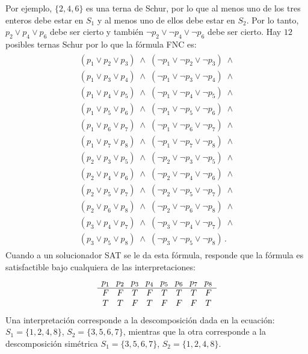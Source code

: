 Por ejemplo, $\{2,4,6\}$ es una terna de Schur, por lo que al menos uno de los tres enteros debe estar en $S_1$ y al menos uno de ellos debe estar en $S_2$. Por lo tanto, $p_2 \vee p_4 \vee p_6$ debe ser cierto y también $\neg p_2 \vee \neg p_4 \vee \neg p_6$ debe ser cierto. Hay $12$ posibles ternas Schur por lo que la fórmula FNC es:
\begin{align}
\begin{array}{l}
(p_1 \vee p_2 \vee p_3) \;\wedge\; (\neg p_1 \vee \neg p_2 \vee \neg p_3) \;\wedge \\
(p_1 \vee p_3 \vee p_4) \;\wedge\; (\neg p_1 \vee \neg p_3 \vee \neg p_4) \;\wedge \\
(p_1 \vee p_4 \vee p_5) \;\wedge\; (\neg p_1 \vee \neg p_4 \vee \neg p_5) \;\wedge \\
(p_1 \vee p_5 \vee p_6) \;\wedge\; (\neg p_1 \vee \neg p_5 \vee \neg p_6) \;\wedge \\
(p_1 \vee p_6 \vee p_7) \;\wedge\; (\neg p_1 \vee \neg p_6 \vee \neg p_7) \;\wedge \\
(p_1 \vee p_7 \vee p_8) \;\wedge\; (\neg p_1 \vee \neg p_7 \vee \neg p_8) \;\wedge \\
(p_2 \vee p_3 \vee p_5) \;\wedge\; (\neg p_2 \vee \neg p_3 \vee \neg p_5) \;\wedge \\
(p_2 \vee p_4 \vee p_6) \;\wedge\; (\neg p_2 \vee \neg p_4 \vee \neg p_6) \;\wedge \\
(p_2 \vee p_5 \vee p_7) \;\wedge\; (\neg p_2 \vee \neg p_5 \vee \neg p_7) \;\wedge \\
(p_2 \vee p_6 \vee p_8) \;\wedge\; (\neg p_2 \vee \neg p_6 \vee \neg p_8) \;\wedge \\
(p_3 \vee p_4 \vee p_7) \;\wedge\; (\neg p_3 \vee \neg p_4 \vee \neg p_7) \;\wedge \\
(p_3 \vee p_5 \vee p_8) \;\wedge\; (\neg p_3 \vee \neg p_5 \vee \neg p_8)\,.
\end{array}\label{eq.schur2}
\end{align}
Cuando a un solucionador SAT se le da esta fórmula, responde que la fórmula es satisfactible bajo cualquiera de las interpretaciones:
\[
\begin{array}{c@{\hspace{8pt}}c@{\hspace{8pt}}c@{\hspace{8pt}}c@{\hspace{8pt}}c@{\hspace{8pt}}c@{\hspace{8pt}}c@{\hspace{8pt}}c}
p_1&p_2&p_3&p_4&p_5&p_6&p_7&p_8\\\hline
F&F&T&F&T&T&T&F\\
T&T&F&T&F&F&F&T
\end{array}
\]
Una interpretación corresponde a la descomposición dada en la ecuación: $S_1=\{1,2,4,8\}$, $S_2=\{3,5,6,7\}$, mientras que la otra corresponde a la descomposición simétrica $S_1=\{3,5,6,7\}$, $S_2=\{1,2,4,8\}$.

